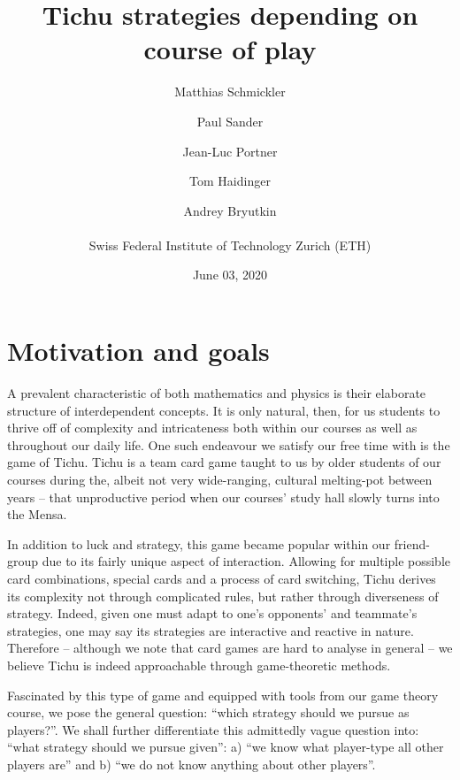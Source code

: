


\usepackage{multirow}
\usepackage{listings}
\usepackage{commath}
\usepackage{subcaption}
\usepackage{float}



\title{Tichu strategies depending on course of play}
\date{June 03, 2020}
\author{Matthias Schmickler \and Paul Sander \and Jean-Luc Portner \and Tom Haidinger \and Andrey Bryutkin \\ \\ Swiss Federal Institute of Technology Zurich (ETH)}
\maketitle

\section*{Motivation and goals}

A prevalent characteristic of both mathematics and physics is their elaborate structure of interdependent concepts. It is only natural, then, for us students to thrive off of complexity and intricateness both within our courses as well as throughout our daily life. One such endeavour we satisfy our free time with is the game of Tichu. Tichu is a team card game taught to us by older students of our courses during the, albeit not very wide-ranging, cultural melting-pot between years – that unproductive period when our courses’ study hall slowly turns into the Mensa. 

    In addition to luck and strategy, this game became popular within our friend-group due to its fairly unique aspect of interaction. Allowing for multiple possible card combinations, special cards and a process of card switching, Tichu derives its complexity not through complicated rules, but rather through diverseness of strategy. Indeed, given one must adapt to one’s opponents’ and teammate’s strategies, one may say its strategies are interactive and reactive in nature. Therefore – although we note that card games are hard to analyse in general – we believe Tichu is indeed approachable through game-theoretic methods. 

    Fascinated by this type of game and equipped with tools from our game theory course, we pose the general question: “which strategy should we pursue as players?”. We shall further differentiate this admittedly vague question into: “what strategy should we pursue given”: a) “we know what player-type all other players are” and b) “we do not know anything about other players”. 
    
